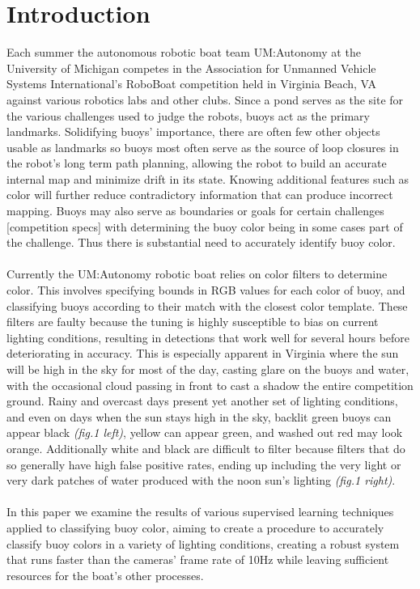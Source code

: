 \documentclass{article} %
\begin{document}
\section{Introduction}
Each summer the autonomous robotic boat team UM:Autonomy at the University of Michigan competes in the Association for Unmanned Vehicle Systems International's RoboBoat competition held in Virginia Beach, VA against various robotics labs and other clubs. Since a pond serves as the site for the various challenges used to judge the robots, buoys act as the primary landmarks. Solidifying buoys' importance, there are often few other objects usable as landmarks so buoys most often serve as the source of loop closures in the robot's long term path planning, allowing the robot to build an accurate internal map and minimize drift in its state. Knowing additional features such as color will further reduce contradictory information that can produce incorrect mapping. Buoys may also serve as boundaries or goals for certain challenges [competition specs] with determining the buoy color being in some cases part of the challenge. Thus there is substantial need to accurately identify 
buoy color.
\\\\Currently the UM:Autonomy robotic boat relies on color filters to determine color. This involves specifying bounds in RGB values for each color of buoy, and classifying buoys according to their match with the closest color template. These filters are faulty because the tuning is highly susceptible to bias on current lighting conditions, resulting in detections that work well for several hours before deteriorating in accuracy. This is especially apparent in Virginia where the sun will be high in the sky for most of the day, casting glare on the buoys and water, with the occasional cloud passing in front to cast a shadow the entire competition ground. Rainy and overcast days present yet another set of lighting conditions, and even on days when the sun stays high in the sky, backlit green buoys can appear black \textit{(fig.1 left)}, yellow can appear green, and washed out red may look orange. Additionally white and black are difficult to filter because filters that do so generally have high false positive rates, ending up including the very light or very dark patches of water produced with the 
noon sun's lighting \textit{(fig.1 right)}.
\\\\In this paper we examine the results of various supervised learning techniques applied to classifying buoy color, aiming to create a procedure to accurately classify buoy colors in a variety of lighting conditions, creating a robust system that runs faster than the cameras' frame rate of 10Hz while leaving sufficient resources for the boat's other processes.
\end{document}
